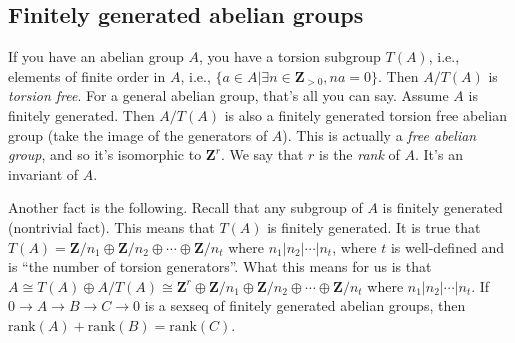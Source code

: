 \documentclass{amsart}
\theoremstyle{theorem}
\theoremstyle{definition}
\newcommand{\Z}{\mathbf Z}
\begin{document}
\subsection{Finitely generated abelian groups}
If you have an abelian group $A$, you have a torsion subgroup $T(A)$, i.e., elements of finite order in $A$, i.e., $\{a\in A|\exists n\in \Z_{>0},na=0\}$. Then $A/T(A)$ is \emph{torsion free}. For a general abelian group, that's all you can say. Assume $A$ is finitely generated. Then $A/T(A)$ is also a finitely generated torsion free abelian group (take the image of the generators of $A$). This is actually a \emph{free abelian group}, and so it's isomorphic to $\Z^r$. We say that $r$ is the \emph{rank} of $A$. It's an invariant of $A$.

Another fact is the following. Recall that any subgroup of $A$ is finitely generated (nontrivial fact). This means that $T(A)$ is finitely generated. It is true that $T(A)=\Z/n_1\oplus\Z/n_2\oplus\cdots\oplus\Z/n_t$ where $n_1|n_2|\cdots|n_t$, where $t$ is well-defined and is ``the number of torsion generators''. What this means for us is that $A\cong T(A)\oplus A/T(A)\cong \Z^r\oplus\Z/n_1\oplus\Z/n_2\oplus\cdots\oplus\Z/n_t$ where $n_1|n_2|\cdots|n_t$. If $0\to A\to B\to C\to 0$ is a sexseq of finitely generated abelian groups, then $\text{rank}(A)+\text{rank}(B)=\text{rank}(C)$.
\end{document}
